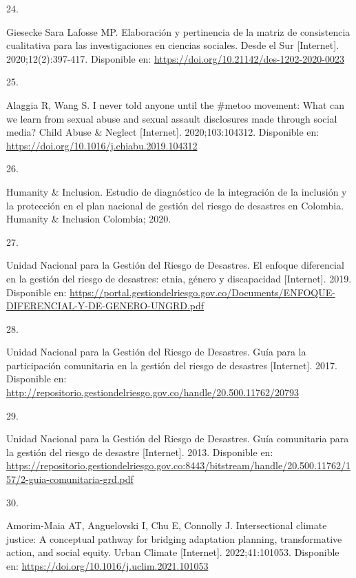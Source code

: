 \documentclass[
  spanish,
  letterpaper,
]{book}
\newlength{\cslhangindent}
\newlength{\csllabelwidth}
\newenvironment{CSLReferences}[2] %
 {\begin{list}{}{%
  \setlength{\itemindent}{0pt}
  \setlength{\leftmargin}{0pt}
  \setlength{\parsep}{0pt}
  \ifodd #1
   \setlength{\leftmargin}{\cslhangindent}
   \setlength{\itemindent}{-1\cslhangindent}
  \fi
  \setlength{\itemsep}{#2\baselineskip}}}
 {\end{list}}
\newcommand{\CSLLeftMargin}[1]{\parbox[t]{\csllabelwidth}{\strut#1\strut}}
\newcommand{\CSLRightInline}[1]{\parbox[t]{\linewidth - \csllabelwidth}{\strut#1\strut}}
\begin{document}
\begin{CSLReferences}{0}{1}
\CSLLeftMargin{24. }%
\CSLRightInline{Giesecke Sara Lafosse MP. Elaboración y pertinencia de
la matriz de consistencia cualitativa para las investigaciones en
ciencias sociales. Desde el Sur {[}Internet{]}. 2020;12(2):397-417.
Disponible en: \url{https://doi.org/10.21142/des-1202-2020-0023}}

\CSLLeftMargin{25. }%
\CSLRightInline{Alaggia R, Wang S. I never told anyone until the \#metoo
movement: What can we learn from sexual abuse and sexual assault
disclosures made through social media? Child Abuse \& Neglect
{[}Internet{]}. 2020;103:104312. Disponible en:
\url{https://doi.org/10.1016/j.chiabu.2019.104312}}

\CSLLeftMargin{26. }%
\CSLRightInline{Humanity \& Inclusion. Estudio de diagnóstico de la
integración de la inclusión y la protección en el plan nacional de
gestión del riesgo de desastres en Colombia. Humanity \& Inclusion
Colombia; 2020. }

\CSLLeftMargin{27. }%
\CSLRightInline{Unidad Nacional para la Gestión del Riesgo de Desastres.
El enfoque diferencial en la gestión del riesgo de desastres: etnia,
género y discapacidad {[}Internet{]}. 2019. Disponible en:
\url{https://portal.gestiondelriesgo.gov.co/Documents/ENFOQUE-DIFERENCIAL-Y-DE-GENERO-UNGRD.pdf}}

\CSLLeftMargin{28. }%
\CSLRightInline{Unidad Nacional para la Gestión del Riesgo de Desastres.
Guía para la participación comunitaria en la gestión del riesgo de
desastres {[}Internet{]}. 2017. Disponible en:
\url{http://repositorio.gestiondelriesgo.gov.co/handle/20.500.11762/20793}}

\CSLLeftMargin{29. }%
\CSLRightInline{Unidad Nacional para la Gestión del Riesgo de Desastres.
Guía comunitaria para la gestión del riesgo de desastre {[}Internet{]}.
2013. Disponible en:
\url{https://repositorio.gestiondelriesgo.gov.co:8443/bitstream/handle/20.500.11762/157/2-guia-comunitaria-grd.pdf}}

\CSLLeftMargin{30. }%
\CSLRightInline{Amorim-Maia AT, Anguelovski I, Chu E, Connolly J.
Intersectional climate justice: A conceptual pathway for bridging
adaptation planning, transformative action, and social equity. Urban
Climate {[}Internet{]}. 2022;41:101053. Disponible en:
\url{https://doi.org/10.1016/j.uclim.2021.101053}}


\end{CSLReferences}
\end{document}
